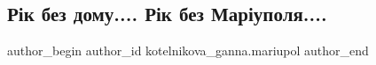  
 
 
 
 

\subsection{Рік без дому.... Рік без Маріуполя....}
\label{sec:16_03_2023.fb.kotelnikova_ganna.mariupol.1.r_k_bez_domu__r_k_be}

\ifcmt
 author_begin
   author_id kotelnikova_ganna.mariupol
 author_end
\fi
